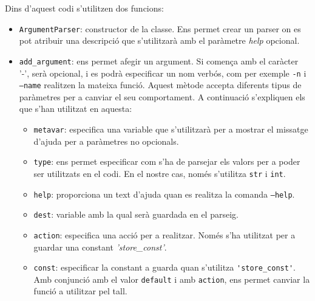  Dins d'aquest codi s'utilitzen dos funcions:
 \begin{itemize}
 	\item \texttt{ArgumentParser}: constructor de la classe. Ens permet crear un parser on es 
 	pot atribuir una descripció que s'utilitzarà amb el paràmetre \textit{help} opcional.
 	
 	\item \verb|add_argument|: ens permet afegir un argument. Si comença amb el caràcter
 	'-', serà opcional, i es podrà especificar un nom verbós, com per exemple \texttt{-n} i
 	\texttt{--name} realitzen la mateixa funció. Aquest mètode accepta diferents tipus de 
 	paràmetres per a canviar el seu comportament. A continuació s'expliquen els que s'han utilitzat
 	en aquesta:
 		\begin{itemize}
 			\item \texttt{metavar}: especifica una variable que s'utilitzarà per a mostrar el missatge
 			d'ajuda per a paràmetres no opcionals.
 			
 			\item \texttt{type}: ens permet especificar com s'ha de parsejar els valors per a poder
 			ser utilitzats en el codi. En el nostre cas, només s'utilitza \texttt{str} i \texttt{int}.
 			
 			\item \texttt{help}: proporciona un text d'ajuda quan es realitza la comanda \texttt{--help}.
 			
 			\item \texttt{dest}: variable amb la qual serà guardada en el parseig.
 			
 			\item \texttt{action}: especifica una acció per a realitzar. Només s'ha utilitzat per a 
 			guardar una constant \textit{'store\_const'}.
 		
 			\item \texttt{const}: especificar la constant a guarda quan s'utilitza \verb|'store_const'|.
 			Amb conjunció amb el valor \texttt{default} i amb \texttt{action}, ens permet canviar 
 			la funció a utilitzar pel tall.
 		\end{itemize}
 \end{itemize}
